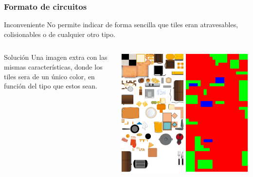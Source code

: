 \begin{frame}
    \frametitle{Formato de circuitos}

        \begin{block}{Inconveniente}
            No permite indicar de forma sencilla que tiles eran atravesables, colisionables o de cualquier otro tipo.
        \end{block}
        
    \begin{columns}
    
        \column{150px}
        \begin{block}{Solución}
        Una imagen extra con las mismas características, donde los tiles sera de un único color, en función del tipo
        que estos sean.
        \end{block}

        \column{150px}
        \begin{center}
                \includegraphics[scale=0.15]{imagenes/tileset-collisionmap.png}
        \end{center}
        
    \end{columns}

\end{frame}

